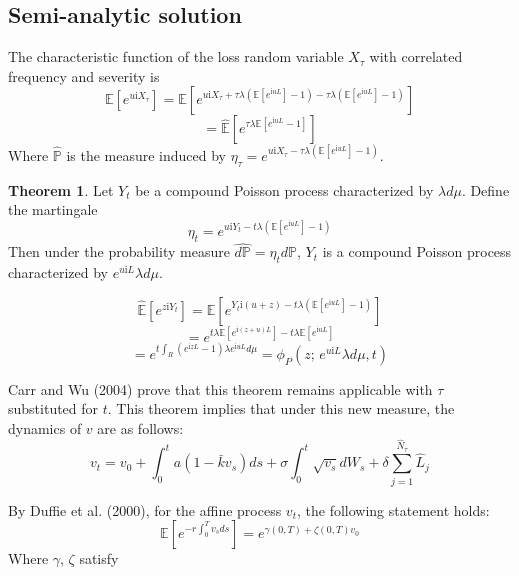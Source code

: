 \documentclass{article}
\theoremstyle{definition}
\newtheorem{theorem}{Theorem}
\newenvironment{sketchproof}{%
  \renewcommand{\proofname}{Sketch of Proof}\proof}{\endproof}
\begin{document}
\subsection{Semi-analytic solution}
The characteristic function of the loss random variable \(X_\tau\) with correlated frequency and severity is 
\[\mathbb{E}[e^{u\mathrm{i}X_\tau}]=\mathbb{E}\left[e^{u\mathrm{i}X_\tau+ \tau \lambda  \left(\mathbb{E}\left[e^{\mathrm{i}uL}\right]-1\right)- \tau \lambda \left(\mathbb{E}\left[e^{\mathrm{i}uL}\right]-1\right)}\right]\]
\[=\mathbb{\hat{E}} \left[e^{\tau \lambda \mathbb{E}\left[e^{\mathrm{i}uL}-1\right]}\right]\]
Where \(\mathbb{\hat{P}}\) is the measure induced by \(\eta_\tau=e^{u\mathrm{i}X_\tau- \tau\lambda \left(\mathbb{E}\left[e^{\mathrm{i}uL}\right]-1\right)}\).  
\begin{theorem}
Let \(Y_t\) be a compound Poisson process characterized by \(\lambda d\mu\).  Define the martingale
\begin{equation}\eta_t=e^{u\mathrm{i}Y_t- t\lambda \left(\mathbb{E}\left[e^{\mathrm{i}uL}\right]-1\right)}\end{equation}
Then under the probability measure \(\hat{d\mathbb{P}}=\eta_t d\mathbb{P}\), \(Y_t\) is a compound Poisson process characterized by \(e^{u\mathrm{i}L}\lambda d\mu\).
\end{theorem}
\begin{sketchproof}
\[\mathbb{\hat{E}}\left[e^{z\mathrm{i}Y_t}\right]=\mathbb{E}\left[e^{Y_t \mathrm{i} (u+z)-t\lambda \left(\mathbb{E}\left[e^{\mathrm{i}uL}\right]-1\right)}\right]\]
\[=e^{t\lambda \mathbb{E}\left[e^{\mathrm{i}(z+u)L}\right]-t\lambda \mathbb{E}\left[e^{\mathrm{i}uL}\right]}\]
\[=e^{t \int_{R} \left(e^{\mathrm{i}zL}-1\right)\lambda e^{\mathrm{i}uL}d\mu}=\phi_{P} (z;\,e^{u\mathrm{i}L}\lambda d\mu, t)\]
\end{sketchproof}

Carr and Wu (2004) prove that this theorem remains applicable with \(\tau\) substituted for \(t\).  This theorem implies that under this new measure, the dynamics of \(v\) are as follows:
\begin{equation}\label{tmcLN}v_t=v_0+\int_0 ^t a(1-\bar{k}v_s)ds+\sigma \int_0 ^ t \sqrt{v_s} dW_s +\delta \sum_{j=1} ^ {\hat{N}_\tau} \hat{L}_j \end{equation}

By Duffie et al. (2000), for the affine process \(v_t\), the following statement holds:
\[\mathbb{E} \left[e^{-r\int_0 ^ {T} v_s ds}\right]=e^{\gamma(0, T)+\zeta(0, T)v_0}\]
Where \(\gamma,\,\zeta\) satisfy
\end{document}
